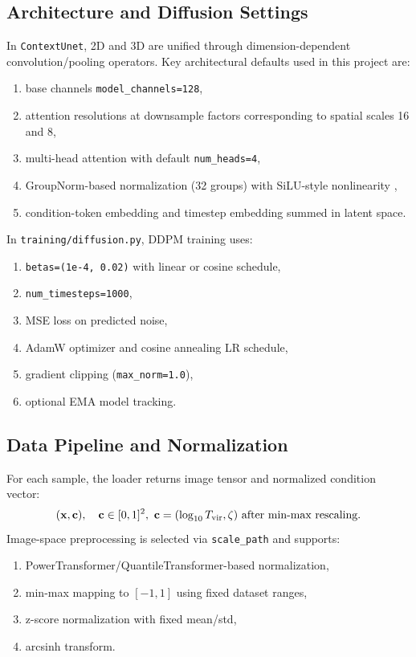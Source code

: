 \documentclass{aastex631}
\begin{document}
\subsection{Architecture and Diffusion Settings}
In \texttt{ContextUnet}, 2D and 3D are unified through dimension-dependent convolution/pooling operators. Key architectural defaults used in this project are:
\begin{enumerate}
    \item base channels \texttt{model\_channels=128},
    \item attention resolutions at downsample factors corresponding to spatial scales 16 and 8,
    \item multi-head attention with default \texttt{num\_heads=4},
    \item GroupNorm-based normalization (32 groups) with SiLU-style nonlinearity \citep{wu2018group},
    \item condition-token embedding and timestep embedding summed in latent space.
\end{enumerate}

In \texttt{training/diffusion.py}, DDPM training uses:
\begin{enumerate}
    \item \texttt{betas=(1e-4, 0.02)} with linear or cosine schedule,
    \item \texttt{num\_timesteps=1000},
    \item MSE loss on predicted noise,
    \item AdamW optimizer and cosine annealing LR schedule,
    \item gradient clipping (\texttt{max\_norm=1.0}),
    \item optional EMA model tracking.
\end{enumerate}

\subsection{Data Pipeline and Normalization}
For each sample, the loader returns image tensor and normalized condition vector:
\begin{equation}
(\mathbf{x},\mathbf{c}),\quad \mathbf{c}\in[0,1]^2,\ \mathbf{c}=(\log_{10}T_{\rm vir},\zeta)\ \text{after min-max rescaling.}
\end{equation}
Image-space preprocessing is selected via \texttt{scale\_path} and supports:
\begin{enumerate}
    \item PowerTransformer/QuantileTransformer-based normalization,
    \item min-max mapping to $[-1,1]$ using fixed dataset ranges,
    \item z-score normalization with fixed mean/std,
    \item arcsinh transform.
\end{enumerate}
\end{document}

